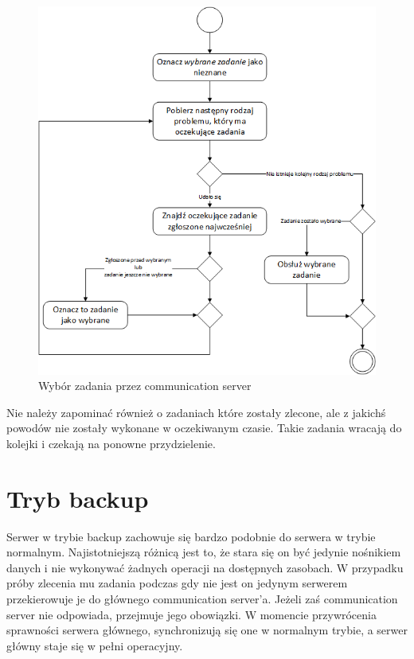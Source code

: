 \documentclass[12pt,a4paper,titlepage]{report}
\begin{document}
		\begin{figure}[h]
			\centering
			\includegraphics[width=\textwidth]{img/CommunicationServer-SelectTask.png}
			\caption{Wybór zadania przez communication server}
		\end{figure}
		
		Nie należy zapominać również o zadaniach które zostały zlecone, ale z jakichś powodów
		nie zostały wykonane w oczekiwanym czasie. Takie zadania wracają do kolejki i czekają na
		ponowne przydzielenie.
		
	\section{Tryb backup}
		Serwer w trybie backup zachowuje się bardzo podobnie do serwera w trybie normalnym.
		Najistotniejszą różnicą jest to, że stara się on być jedynie nośnikiem danych
		i nie wykonywać żadnych operacji na dostępnych zasobach. W przypadku próby zlecenia
		mu zadania podczas gdy nie jest on jedynym serwerem przekierowuje je do głównego 
		communication server'a.	Jeżeli zaś communication server nie odpowiada, przejmuje jego obowiązki.
		W momencie przywrócenia sprawności serwera głównego, synchronizują się one w normalnym
		trybie, a serwer główny staje się w pełni operacyjny.
		
\end{document}
